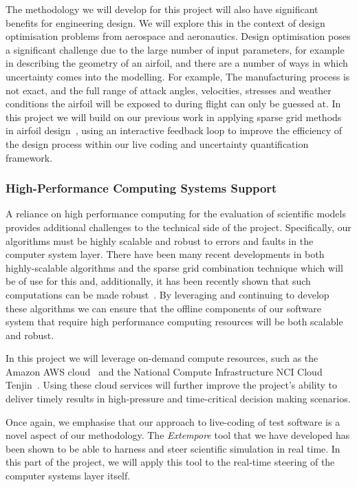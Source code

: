 \documentclass[a4paper,fontsize=12pt]{scrartcl}
\begin{document}
The methodology we will develop for this project will also have
significant benefits for engineering design. We will explore this in
the context of design optimisation problems from aerospace and
aeronautics. Design optimisation poses a significant challenge due to
the large number of input parameters, for example in describing the
geometry of an airfoil, and there are a number of ways in which
uncertainty comes into the modelling. For example, The manufacturing
process is not exact, and the full range of attack angles, velocities,
stresses and weather conditions the airfoil will be exposed to during
flight can only be guessed at. In this project we will build on our
previous work in applying sparse grid methods in airfoil
design~\parencite{SU2,deBaarHarding2015}, using an interactive
feedback loop to improve the efficiency of the design process within
our live coding and uncertainty quantification framework.


\subsubsection*{High-Performance Computing Systems Support}

A reliance on high performance computing for the evaluation of
scientific models provides additional challenges to the technical side
of the project. Specifically, our algorithms must be highly scalable
and robust to errors and faults in the computer system layer. There
have been many recent developments in both highly-scalable algorithms
and the sparse grid combination technique which will be of use for
this and, additionally, it has been recently shown that such
computations can be made
robust~\parencite{HardingHLS2015,AliEtal2015,Ali11022016}. By leveraging and
continuing to develop these algorithms we can ensure that the
offline components of our software system that require high performance
computing resources will be both scalable and robust.

In this project we will leverage on-demand compute resources, such as
the Amazon AWS cloud~\parencite{amazon_aws} and the National Compute
Infrastructure NCI Cloud Tenjin~\parencite{nci_cloud}. Using these cloud
services will further improve the project's ability to deliver timely
results in high-pressure and time-critical decision making scenarios.

Once again, we emphasise that our approach to live-coding of test
software is a novel aspect of our methodology. The \emph{Extempore}
tool that we have developed has been shown to be able to harness and
steer scientific simulation in real time. In this part of the project,
we will apply this tool to the real-time steering of the computer
systems layer itself.
\end{document}
